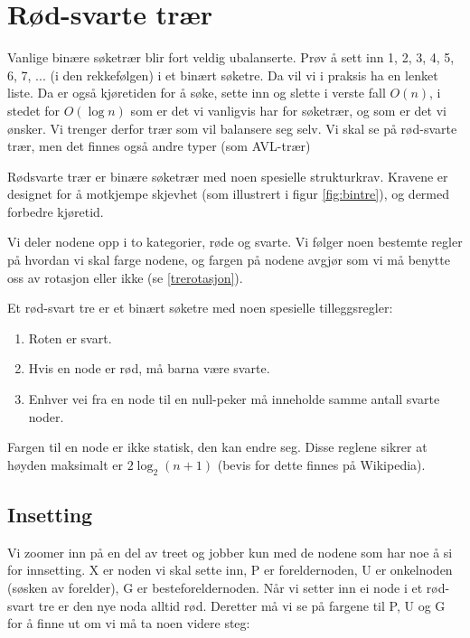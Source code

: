 \section{Rød-svarte trær} \label{rb_tre}
Vanlige binære søketrær blir fort veldig ubalanserte. Prøv å sett inn 1, 2, 3, 4, 5, 6, 7, ... (i den rekkefølgen) i et binært søketre. Da vil vi i praksis ha en lenket liste. Da er også kjøretiden for å søke, sette inn og slette i verste fall $ O(n) $, i stedet for $ O(\log n) $ som er det vi vanligvis har for søketrær, og som er det vi ønsker. Vi trenger derfor trær som vil balansere seg selv. Vi skal se på rød-svarte trær, men det finnes også andre typer (som AVL-trær)

Rødsvarte trær er binære søketrær med noen spesielle strukturkrav. Kravene er designet for å motkjempe skjevhet (som illustrert i figur \ref{fig:bintre}), og dermed forbedre kjøretid.

Vi deler nodene opp i to kategorier, røde og svarte. Vi følger noen bestemte regler på hvordan vi skal farge nodene, og fargen på nodene avgjør som vi må benytte oss av rotasjon eller ikke (se \ref{trerotasjon}). 

\begin{definition}
	Et rød-svart tre er et binært søketre med noen spesielle tilleggsregler:
	\begin{enumerate}[i]
		\item Roten er svart.
		\item Hvis en node er rød, må barna være svarte.
		\item Enhver vei fra en node til en null-peker må inneholde samme antall svarte noder.
	\end{enumerate}
\end{definition}

Fargen til en node er ikke statisk, den kan endre seg. Disse reglene sikrer at høyden maksimalt er $ 2\log_2 (n+1) $ (bevis for dette finnes på Wikipedia).

\subsection{Insetting}
Vi zoomer inn på en del av treet og jobber kun med de nodene som har noe å si for innsetting. X er noden vi skal sette inn, P er foreldernoden, U er onkelnoden (søsken av forelder), G er besteforeldernoden. Når vi setter inn ei node i et rød-svart tre er den nye noda alltid rød. Deretter må vi se på fargene til P, U og G for å finne ut om vi må ta noen videre steg:

